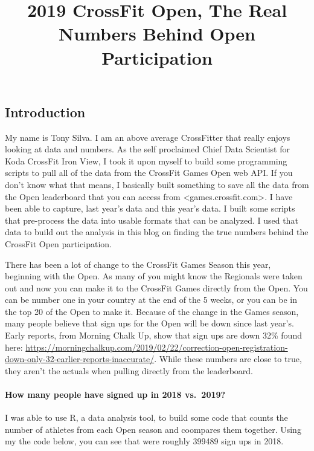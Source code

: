 \documentclass[]{article}
\title{2019 CrossFit Open, The Real Numbers Behind Open Participation}
\author{}
\date{}
\let\oldparagraph\paragraph
\renewcommand{\paragraph}[1]{\oldparagraph{#1}\mbox{}}
\begin{document}
\maketitle

\subsection{Introduction}\label{introduction}

My name is Tony Silva. I am an above average CrossFitter that really
enjoys looking at data and numbers. As the self proclaimed Chief Data
Scientist for Koda CrossFit Iron View, I took it upon myself to build
some programming scripts to pull all of the data from the CrossFit Games
Open web API. If you don't know what that means, I basically built
something to save all the data from the Open leaderboard that you can
access from \textless{}games.crossfit.com\textgreater{}. I have been
able to capture, last year's data and this year's data. I built some
scripts that pre-process the data into usable formats that can be
analyzed. I used that data to build out the analysis in this blog on
finding the true numbers behind the CrossFit Open participation.

There has been a lot of change to the CrossFit Games Season this year,
beginning with the Open. As many of you might know the Regionals were
taken out and now you can make it to the CrossFit Games directly from
the Open. You can be number one in your country at the end of the 5
weeks, or you can be in the top 20 of the Open to make it. Because of
the change in the Games season, many people believe that sign ups for
the Open will be down since last year's. Early reports, from Morning
Chalk Up, show that sign ups are down 32\% found here:
\url{https://morningchalkup.com/2019/02/22/correction-open-registration-down-only-32-earlier-reports-inaccurate/}.
While these numbers are close to true, they aren't the actuals when
pulling directly from the leaderboard.

\paragraph{How many people have signed up in 2018
vs.~2019?}\label{how-many-people-have-signed-up-in-2018-vs.2019}

I was able to use R, a data analysis tool, to build some code that
counts the number of athletes from each Open season and coompares them
together. Using my the code below, you can see that were roughly 399489
sign ups in 2018.
\end{document}
